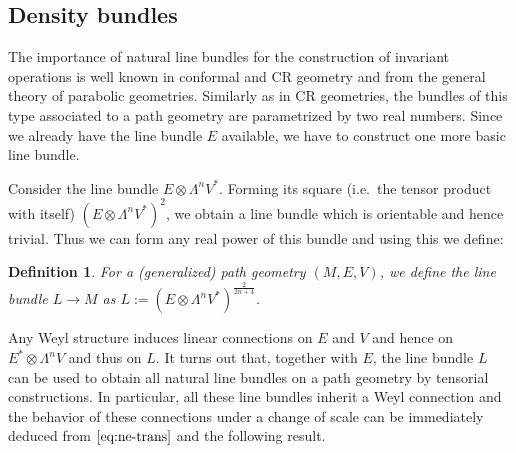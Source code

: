 \documentclass[11pt]{amsart}
\newtheorem{definition}[proposition]{Definition}
\numberwithin{proposition}{section}
\numberwithin{equation}{section}
\begin{document}
\subsection{Density bundles}\label{4.2}
The importance of natural line bundles for the construction of invariant operations is well known in conformal and CR geometry and from the general theory of parabolic geometries. Similarly as in CR geometries, the bundles of this type associated to a path geometry are parametrized by two real numbers. Since we already have the line bundle $E$ available, we have to construct one more basic line bundle. 

Consider the line bundle $E\otimes\Lambda^n V^*$. Forming its square (i.e.\ the tensor product with itself) $(E\otimes\Lambda^nV^*)^2$, we obtain a line bundle which is orientable and hence trivial. Thus we can form any real power of this bundle and using this we define:
\begin{definition}\label{def:L}
For a (generalized) path geometry $(M,E,V)$, we define the line bundle $L\to M$ as $L:=(E\otimes\Lambda^nV^*)^{\frac{2}{2n+4}}$. 
\end{definition}
Any Weyl structure induces linear connections on $E$ and $V$ and hence on $E^*\otimes\Lambda^nV$ and thus on $L$. It turns out that, together with $E$, the line bundle $L$ can be used to obtain all natural line bundles on a path geometry by tensorial constructions. In particular, all these line bundles inherit a Weyl connection and the behavior of these connections under a change of scale can be immediately deduced from $\eqref{eq:ne-trans}$ and the following result. 
\end{document}
